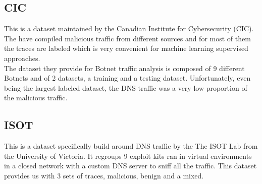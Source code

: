 \subsection{CIC}
This is a dataset maintained by the Canadian Institute for Cybersecurity\cite{cic} (CIC). The have compiled malicious traffic from different sources and for most of them the traces are labeled which is very convenient for machine learning supervised approaches.\\ 
The dataset they provide for Botnet traffic analysis is composed of 9 different Botnets and of 2 datasets, a training and a testing dataset. Unfortunately, even being the largest labeled  dataset, the DNS traffic was a very low proportion of the malicious traffic. 

\subsection{ISOT}
This is a dataset specifically build around DNS traffic by the The ISOT Lab from the University of Victoria. It regroups 9 exploit kits ran in virtual environments in a closed network with a custom DNS server to sniff all the traffic. This dataset provides us with 3 sets of traces, malicious, benign and a mixed\cite{isot}.
	
